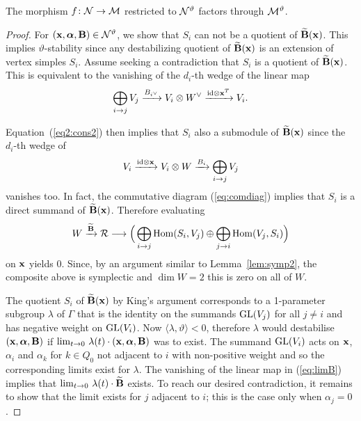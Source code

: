 \documentclass{amsart}
\newcommand{\balpha}{\boldsymbol{\alpha}}
\theoremstyle{definition}
\begin{document}

\begin{proposition}
The morphism $f \colon \mathcal{N} \rightarrow \mathcal{M}$ restricted to $\mathcal{N}^\vartheta$ factors through $\mathcal{M}^\vartheta$.
\end{proposition}

\begin{proof}
For $(\bfx, \balpha, \bfB) \in \cN^\vartheta$, we show that $S_i$ can not be a quotient of $\widetilde{\mathbf{B}}(\mathbf{x})$. This implies $\vartheta$-stability since any destabilizing quotient of $\widetilde{\mathbf{B}}(\mathbf{x})$ is an extension of vertex simples $S_i$.
Assume seeking a contradiction that $S_i$ is a quotient of $\widetilde{\mathbf{B}}(\mathbf{x})$.
This is equivalent to the vanishing of the $d_i$-th wedge of the linear map
$$\bigoplus_{i \rightarrow j} V_j \xrightarrow{B_{i^\vee}} V_i \otimes W^\vee \xrightarrow{\text{id} \otimes \mathbf{x}^T} V_i.$$

Equation~(\ref{eq2:cons2}) then implies that $S_i$ also a submodule of $\widetilde{\mathbf{B}}(\mathbf{x})$ since the $d_i$-th wedge of 
$$V_i \xrightarrow{\text{id} \otimes \mathbf{x}} V_i \otimes W \xrightarrow{B_i} \bigoplus_{i \rightarrow j} V_j$$
vanishes too.
In fact, the commutative diagram (\ref{eq:comdiag}) implies that $S_i$ is a direct summand of $\widetilde{\mathbf{B}}(\mathbf{x})$.
Therefore evaluating 
\begin{equation}\label{eq:limB}
W \xrightarrow{\widetilde{\mathbf{B}}} \mathcal{R} \longrightarrow \Big(\bigoplus_{i \rightarrow j} \operatorname{Hom}(S_i,V_j) \oplus \bigoplus_{j \rightarrow i} \operatorname{Hom}(V_j, S_i)\Big)
\end{equation}
on $\mathbf{x}$ yields 0.
Since, by an argument similar to Lemma~\ref{lem:symp2}, the composite above is symplectic and $\dim W=2$ this is zero on all of $W$.

The quotient $S_i$ of $\widetilde{\mathbf{B}}(\mathbf{x})$ by King's argument corresponds to a 1-parameter subgroup $\lambda$ of $\Gamma$ that is the identity on the summands $\operatorname{GL}(V_j)$ for all $j\neq i$ and has negative weight on $\operatorname{GL}(V_i)$. 
Now $\langle \lambda, \vartheta\rangle <0$, therefore $\lambda$ would destabilise $(\bfx, \balpha, \bfB)$ if $\lim_{t \rightarrow 0} \, \lambda(t)\cdot (\bfx, \balpha, \bfB)$ was to exist.
The summand $\operatorname{GL}(V_i)$ acts on $\mathbf{x}$, $\alpha_i$ and $\alpha_k$ for $k \in Q_0$ not adjacent to $i$ with non-positive weight and so the corresponding limits exist for $\lambda$.
The vanishing of the linear map in (\ref{eq:limB}) implies that $\lim_{t \rightarrow 0}\, \lambda(t)\cdot \widetilde{\mathbf{B}}$ exists.
To reach our desired contradiction, it remains to show that the limit exists for $j$ adjacent to $i$; this is the case only when $\alpha_j=0$.


\end{proof}
\end{document}
